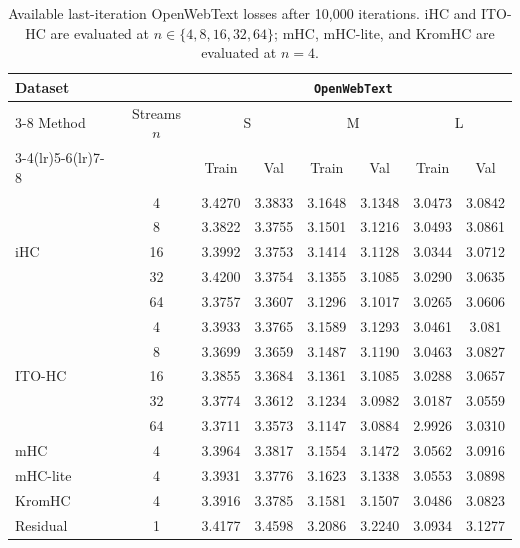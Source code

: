 \documentclass{article}
\begin{document}
\begin{table}[H]
\caption{Available last-iteration OpenWebText losses after 10,000 iterations. iHC and ITO-HC are evaluated at $n\in\{4,8,16,32,64\}$; mHC, mHC-lite, and KromHC are evaluated at $n=4$.}
\label{tab:experiments}
\begin{center}
{\setlength{\tabcolsep}{2pt}
\renewcommand{\arraystretch}{0.68}
\footnotesize
\begin{tabular}{l c cc cc cc}
\toprule
Dataset & & \multicolumn{6}{c}{\texttt{OpenWebText}}\\
\cmidrule(lr){3-8}
Method & Streams $n$ & \multicolumn{2}{c}{\textsf{S}} & \multicolumn{2}{c}{\textsf{M}} & \multicolumn{2}{c}{\textsf{L}}\\
\cmidrule(lr){3-4}\cmidrule(lr){5-6}\cmidrule(lr){7-8}
& & Train & Val & Train & Val & Train & Val\\
\midrule
\multirow{5}{*}{iHC}
 & 4  & 3.4270 & 3.3833 & 3.1648 & 3.1348 & 3.0473 & 3.0842\\
 & 8  & 3.3822 & 3.3755 & 3.1501 & 3.1216 & 3.0493 & 3.0861\\
 & 16 & 3.3992 & 3.3753 & 3.1414 & 3.1128 & 3.0344 & 3.0712\\
 & 32 & 3.4200 & 3.3754 & 3.1355 & 3.1085 & 3.0290 & 3.0635\\
 & 64 & 3.3757 & 3.3607 & 3.1296 & 3.1017 & 3.0265 & 3.0606\\
\midrule
\multirow{5}{*}{ITO-HC}
 & 4  & 3.3933 & 3.3765 & 3.1589 & 3.1293 & 3.0461 & 3.081\\
 & 8  & 3.3699 & 3.3659 & 3.1487 & 3.1190 & 3.0463 & 3.0827\\
 & 16 & 3.3855 & 3.3684 & 3.1361 & 3.1085 & 3.0288 & 3.0657\\
 & 32 & 3.3774 & 3.3612 & 3.1234 & 3.0982 & 3.0187 & 3.0559\\
 & 64 & 3.3711 & 3.3573 & 3.1147 & 3.0884 & 2.9926 & 3.0310\\
\midrule
mHC & 4  & 3.3964 & 3.3817 & 3.1554 & 3.1472 & 3.0562 & 3.0916\\
mHC-lite & 4 & 3.3931 & 3.3776 & 3.1623 & 3.1338 & 3.0553 & 3.0898\\
KromHC   & 4 & 3.3916 & 3.3785 & 3.1581 & 3.1507 & 3.0486 & 3.0823\\
Residual & 1 & 3.4177 & 3.4598 & 3.2086 & 3.2240 & 3.0934 & 3.1277\\
\bottomrule
\end{tabular}}
\end{center}
\end{table}
\end{document}

